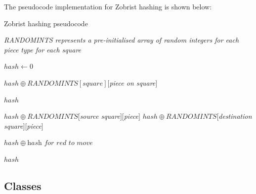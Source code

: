 \documentclass[../main/main.tex]{subfiles}
\begin{document}
\noindent The pseudocode implementation for Zobrist hashing is shown below:

\begin{algorithm}
\caption{Zobrist hashing pseudocode}
\begin{algorithmic}
    \item \textit{RANDOMINTS represents a pre-initialised array of random integers for each piece type for each square}
    
    \bigskip

        \State $hash \gets 0$

                \State $hash \oplus RANDOMINTS[square][$\textit{piece on square}$]$
            \EndIf
        \EndFor
        
        \State \Return $hash$
    \EndFunction

    \bigskip

        \State $hash \oplus RANDOMINTS[$\textit{source square}$][$\textit{piece}$]$
        \State $hash \oplus RANDOMINTS[$\textit{destination square}$][$\textit{piece}$]$

            \State $hash \oplus \textit{hash for red to move}$ 
        \EndIf
        
        \State \Return $hash$
    \EndFunction
\end{algorithmic}
\end{algorithm}




\subsection{Classes}
\end{document}

